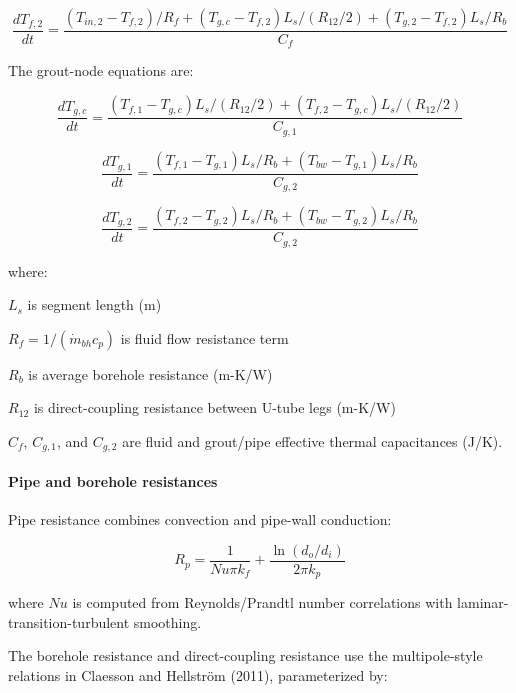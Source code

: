 \begin{equation}
\frac{dT_{f,2}}{dt} = \frac{\left(T_{in,2}-T_{f,2}\right)/R_f + \left(T_{g,c}-T_{f,2}\right)L_s/(R_{12}/2) + \left(T_{g,2}-T_{f,2}\right)L_s/R_b}{C_f}
\end{equation}

The grout-node equations are:

\begin{equation}
\frac{dT_{g,c}}{dt} = \frac{\left(T_{f,1}-T_{g,c}\right)L_s/(R_{12}/2) + \left(T_{f,2}-T_{g,c}\right)L_s/(R_{12}/2)}{C_{g,1}}
\end{equation}

\begin{equation}
\frac{dT_{g,1}}{dt} = \frac{\left(T_{f,1}-T_{g,1}\right)L_s/R_b + \left(T_{bw}-T_{g,1}\right)L_s/R_b}{C_{g,2}}
\end{equation}

\begin{equation}
\frac{dT_{g,2}}{dt} = \frac{\left(T_{f,2}-T_{g,2}\right)L_s/R_b + \left(T_{bw}-T_{g,2}\right)L_s/R_b}{C_{g,2}}
\end{equation}

where:

\(L_s\) is segment length (m)

\(R_f = 1/(\dot m_{bh} c_p)\) is fluid flow resistance term

\(R_b\) is average borehole resistance (m-K/W)

\(R_{12}\) is direct-coupling resistance between U-tube legs (m-K/W)

\(C_f\), \(C_{g,1}\), and \(C_{g,2}\) are fluid and grout/pipe effective thermal capacitances (J/K).

\paragraph{Pipe and borehole resistances}\label{pipe-and-borehole-resistances-glhec}

Pipe resistance combines convection and pipe-wall conduction:

\begin{equation}
R_p = \frac{1}{Nu \pi k_f} + \frac{\ln\left(d_o/d_i\right)}{2\pi k_p}
\end{equation}

where \(Nu\) is computed from Reynolds/Prandtl number correlations with laminar-transition-turbulent smoothing.

The borehole resistance and direct-coupling resistance use the multipole-style relations in Claesson and Hellstr\"om (2011), parameterized by:

